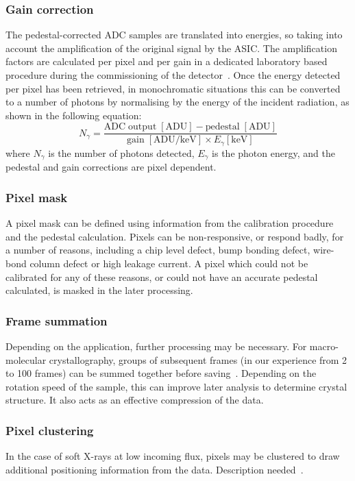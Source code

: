 \documentclass[a4paper]{article}
\begin{document}
\subsubsection{Gain correction}
The pedestal-corrected ADC samples are translated into energies, so taking into account the amplification of the original signal by the ASIC. The amplification factors are calculated per pixel and per gain in a dedicated laboratory based procedure during the commissioning of the detector~\cite{JFcalibration}. Once the energy detected per pixel has been retrieved, in monochromatic situations this can be converted to a number of photons by normalising by the energy of the incident radiation, as shown in the following equation:
\begin{equation}
    N_{\gamma} = \frac{\mathrm{ADC\;output\;[ADU]} - \mathrm{pedestal\;[ADU]}}{\mathrm{gain\;[ADU/keV]} \times E_{\gamma} \mathrm{[keV]}}
\end{equation}
where $N_{\gamma}$ is the number of photons detected, $E_{\gamma}$ is the photon energy, and the pedestal and gain corrections are pixel dependent.

\subsubsection{Pixel mask}
A pixel mask can be defined using information from the calibration procedure and the pedestal calculation. Pixels can be non-responsive, or respond badly, for a number of reasons, including a chip level defect, bump bonding defect, wire-bond column defect or high leakage current. A pixel which could not be calibrated for any of these reasons, or could not have an accurate pedestal calculated, is masked in the later processing.

\subsubsection{Frame summation}
Depending on the application, further processing may be necessary. For macro-molecular crystallography, groups of subsequent frames (in our experience from 2 to 100 frames) can be summed together before saving~\cite{Leonarski_2018}. Depending on the rotation speed of the sample, this can improve later analysis to determine crystal structure. It also acts as an effective compression of the data.

\subsubsection{Pixel clustering}
In the case of soft X-rays at low incoming flux, pixels may be clustered to draw additional positioning information from the data. Description needed~\cite{Cartier_2015}.
\end{document}
